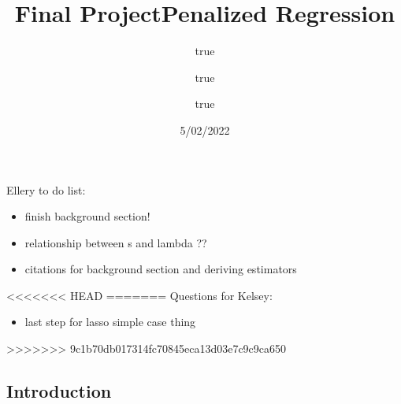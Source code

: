 \documentclass[
]{article}
\title{Final Project}
\author{}
\date{\vspace{-2.5em}}
\title{Penalized Regression}
\author{true \and true \and true}
\date{5/02/2022}
\providecommand{\tightlist}{%
  \setlength{\itemsep}{0pt}\setlength{\parskip}{0pt}}
\begin{document}
\maketitle

{
\setcounter{tocdepth}{2}
\tableofcontents
}
Ellery to do list:

\begin{itemize}
\tightlist
\item
  finish background section!
\item
  relationship between s and lambda ??
\item
  citations for background section and deriving estimators
\end{itemize}

<<<<<<< HEAD
=======
Questions for Kelsey:

\begin{itemize}
\tightlist
\item
  last step for lasso simple case thing
\end{itemize}

>>>>>>> 9c1b70db017314fc70845eca13d03e7c9c9ca650
\hypertarget{introduction}{%
\subsection{Introduction}\label{introduction}}
\end{document}
